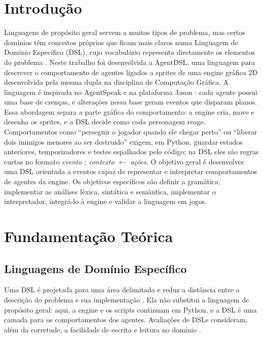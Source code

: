 \documentclass[conference]{IEEEtran}
\begin{document}
\section{Introdução}
Linguagens de propósito geral servem a muitos tipos de problema, mas certos domínios têm conceitos próprios que ficam mais claros numa Linguagem de Domínio Específico (DSL), cujo vocabulário representa diretamente os elementos do problema \cite{mernik2005,vandeursen2000}.
Neste trabalho foi desenvolvida a AgentDSL, uma linguagem para descrever o comportamento de agentes ligados a sprites de uma engine gráfica 2D desenvolvida pela mesma dupla na disciplina de Computação Gráfica. A linguagem é inspirada no AgentSpeak \cite{rao1996} e na plataforma Jason \cite{bordini2007}: cada agente possui uma base de crenças, e alterações nessa base geram eventos que disparam planos.
Essa abordagem separa a parte gráfica do comportamento: a engine cria, move e desenha os sprites, e a DSL decide como cada personagem reage. Comportamentos como ``perseguir o jogador quando ele chegar perto'' ou ``liberar dois inimigos menores ao ser destruído'' exigem, em Python, guardar estados anteriores, temporizadores e testes espalhados pelo código; na DSL eles são regras curtas no formato \textit{evento : contexto $\leftarrow$ ações}.
O objetivo geral é desenvolver uma DSL orientada a eventos capaz de representar e interpretar comportamentos de agentes da engine. Os objetivos específicos são definir a gramática, implementar as análises léxica, sintática e semântica, implementar o interpretador, integrá-lo à engine e validar a linguagem em jogos.

\section{Fundamentação Teórica}

\subsection{Linguagens de Domínio Específico}
Uma DSL é projetada para uma área delimitada e reduz a distância entre a descrição do problema e sua implementação \cite{mernik2005}. Ela não substitui a linguagem de propósito geral: aqui, a engine e os scripts continuam em Python, e a DSL é uma camada para os comportamentos dos agentes. Avaliações de DSLs consideram, além da corretude, a facilidade de escrita e leitura no domínio \cite{rodrigues2017}.
\end{document}
